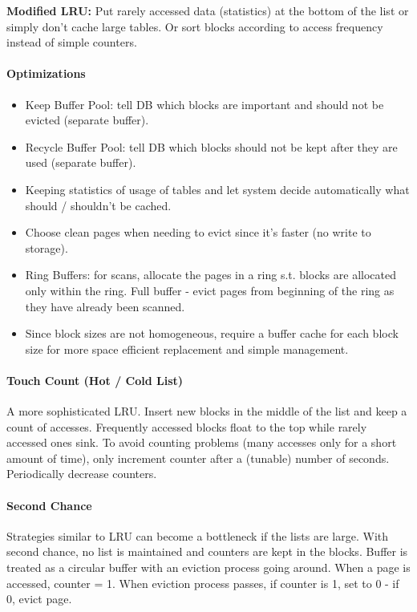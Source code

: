 \textbf{Modified LRU:} Put rarely accessed data (statistics) at the bottom of the list or simply don't cache large tables. Or sort blocks according to access frequency instead of simple counters.

\paragraph{Optimizations}
\begin{itemize}
    \item Keep Buffer Pool: tell DB which blocks are important and should not be evicted (separate buffer).
    \item Recycle Buffer Pool: tell DB which blocks should not be kept after they are used (separate buffer).
    \item Keeping statistics of usage of tables and let system decide automatically what should / shouldn't be cached.
    \item Choose clean pages when needing to evict since it's faster (no write to storage).
    \item Ring Buffers: for scans, allocate the pages in a ring s.t. blocks are allocated only within the ring. Full buffer - evict pages from beginning of the ring as they have already been scanned.
    \item Since block sizes are not homogeneous, require a buffer cache for each block size for more space efficient replacement and simple management.
\end{itemize}


\paragraph{Touch Count (Hot / Cold List)}
A more sophisticated LRU. Insert new blocks in the middle of the list and keep a count of accesses. Frequently accessed blocks float to the top while rarely accessed ones sink. To avoid counting problems (many accesses only for a short amount of time), only increment counter after a (tunable) number of seconds. Periodically decrease counters.

\paragraph{Second Chance}
Strategies similar to LRU can become a bottleneck if the lists are large. With second chance, no list is maintained and counters are kept in the blocks. Buffer is treated as a circular buffer with an eviction process going around. When a page is accessed, counter = 1. When eviction process passes, if counter is 1, set to 0 - if 0, evict page.

